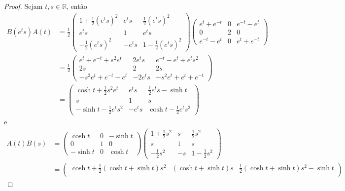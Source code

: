 \begin{proof}
    Sejam \(t,s \in \mathbb{R}\), então
    \begin{align*}
        B(e^t s) A(t)
        &= \frac12\begin{pmatrix}
            1 + \frac12(e^ts)^2 & e^ts & \frac12 (e^ts)^2\\
            e^ts & 1  & e^ts\\
            - \frac12 ( e^ts)^2 & - e^ts & 1 - \frac12 (e^ts)^2
        \end{pmatrix}
        \begin{pmatrix}
            e^t + e^{-t} & 0 & e^{-t} - e^{t}\\
            0 & 2 & 0\\
            e^{-t} - e^{t} & 0 & e^{t} + e^{-t}
        \end{pmatrix}\\
        &= \frac12
        \begin{pmatrix}
            e^t + e^{-t} + s^2 e^{t} & 2 e^t s & e^{-t} - e^{t} + e^{t}s^2\\
            2s & 2 & 2s\\
            -s^2e^t + e^{-t} - e^{t} & -2e^t s & -s^2e^{t} + e^{t} + e^{-t}
        \end{pmatrix}\\
        &= \begin{pmatrix}
            \cosh{t} + \frac12s^2e^t & e^ts & \frac12e^ts - \sinh{t}\\
            s & 1 & s\\
            -\sinh{t} - \frac12 e^ts^2 & -e^ts & \cosh{t} - \frac12 e^t s^2
        \end{pmatrix}
    \end{align*}
    e
    \begin{align*}
        A(t)B(s) &= \begin{pmatrix}
            \cosh{t} & 0 & -\sinh{t}\\
            0 & 1 & 0\\
            -\sinh{t} & 0 & \cosh{t}
        \end{pmatrix}
        \begin{pmatrix}
            1 + \frac12 s^2 & s & \frac12s^2\\
            s & 1 & s\\
            -\frac12s^2 & -s & 1 - \frac12s^2
        \end{pmatrix}\\
                 &= \begin{pmatrix}
                     \cosh{t} + \frac12(\cosh{t} + \sinh{t})s^2 & (\cosh{t} + \sinh{t})s & \frac12(\cosh{t} + \sinh{t})s^2-\sinh{t}\\

\end{pmatrix}
\end{align*}
\end{proof}
